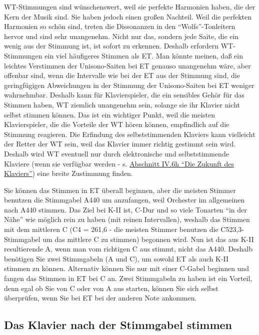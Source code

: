 WT-Stimmungen sind wünschenswert, weil sie perfekte Harmonien haben, die der Kern der Musik sind.
Sie haben jedoch einen großen Nachteil.
Weil die perfekten Harmonien so schön sind, treten die Dissonanzen in den \enquote{Wolfs}-Tonleitern hervor und sind sehr unangenehm.
Nicht nur das, sondern jede Saite, die ein wenig aus der Stimmung ist, ist sofort zu erkennen.
Deshalb erfordern WT-Stimmungen ein viel häufigeres Stimmen als ET.
Man könnte meinen, daß ein leichtes Verstimmen der Unisono-Saiten bei ET genauso unangenehm wäre, aber offenbar sind, wenn die Intervalle wie bei der ET aus der Stimmung sind, die geringfügigen Abweichungen in der Stimmung der Unisono-Saiten bei ET weniger wahrnehmbar.
Deshalb kann für Klavierspieler, die ein sensibles Gehör für das Stimmen haben, WT ziemlich unangenehm sein, solange sie ihr Klavier nicht selbst stimmen können.
Das ist ein wichtiger Punkt, weil die meisten Klavierspieler, die die Vorteile der WT hören können, empfindlich auf die Stimmung reagieren.
Die Erfindung des selbststimmenden Klaviers kann vielleicht der Retter der WT sein, weil das Klavier immer richtig gestimmt sein wird.
Deshalb wird WT eventuell nur durch elektronische und selbststimmende Klaviere (wenn sie verfügbar werden - s. \hyperref[c1iv6h]{Abschnitt IV.6h \enquote{Die Zukunft des Klaviers}}) eine breite Zustimmung finden.

Sie können das Stimmen in ET überall beginnen, aber die meisten Stimmer benutzen die Stimmgabel A440 um anzufangen, weil Orchester im allgemeinen nach A440 stimmen.
Das Ziel bei K-II ist, C-Dur und so viele Tonarten \enquote{in der Nähe} wie möglich rein zu haben (mit reinen Intervallen), weshalb das Stimmen mit dem mittleren C (C4 = 261,6 - die meisten Stimmer benutzen die C523,3-Stimmgabel um das mittlere C zu stimmen) begonnen wird.
Nun ist das aus K-II resultierende A, wenn man vom richtigen C aus stimmt, nicht das A440.
Deshalb benötigen Sie zwei Stimmgabeln (A und C), um sowohl ET als auch K-II stimmen zu können.
Alternativ können Sie nur mit einer C-Gabel beginnen und fangen das Stimmen in ET bei C an.
Zwei Stimmgabeln zu haben ist ein Vorteil, denn egal ob Sie von C oder von A aus starten, können Sie sich selbst überprüfen, wenn Sie bei ET bei der anderen Note ankommen.


\hypertarget{c2_6b}{}
\subsection{Das Klavier nach der Stimmgabel stimmen}
\label{c2_6_gabe}

